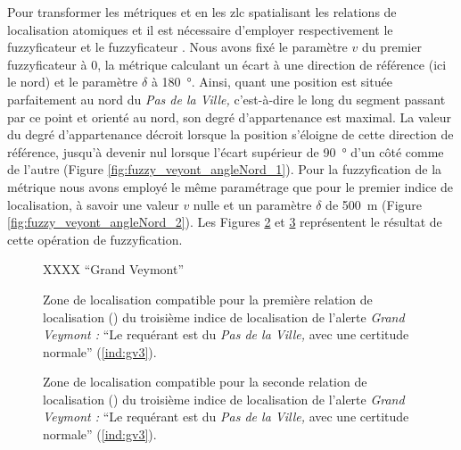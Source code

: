 Pour transformer les métriques  et
 en les \ac{zlc} spatialisant les relations de
localisation atomiques  et
 il est nécessaire
d'employer respectivement le fuzzyficateur  et
le fuzzyficateur . Nous avons fixé le
paramètre \(v\) du premier fuzzyficateur à 0, la métrique
 calculant un écart à une direction de
référence (ici le nord) et le paramètre \(\delta\) à
\SI{180}{\degree}. Ainsi, quant une position est située parfaitement
au nord du \emph{Pas de la Ville,} c'est-à-dire le long du segment
passant par ce point et orienté au nord, son degré d'appartenance est
maximal. La valeur du degré d'appartenance décroit lorsque la position
s'éloigne de cette direction de référence, jusqu'à devenir nul lorsque
l'écart supérieur de \SI{90}{\degree} d'un côté comme de l'autre
(Figure \ref{fig:fuzzy_veyont_angleNord_1}). Pour la fuzzyfication de
la métrique  nous avons employé le même
paramétrage que pour le premier indice de localisation, à savoir une
valeur \(v\) nulle et un paramètre \(\delta\) de \SI{500}{\meter}
(Figure \ref{fig:fuzzy_veyont_angleNord_2}). Les Figures
\ref{fig:ZLC_Nord_Pas_Ville} et \ref{fig:ZLC_Ext_Pas_Ville}
représentent le résultat de cette opération de fuzzyfication.

\begin{figure} \centering
\subfloat[\label{fig:fuzzy_veyont_angleNord_1}]{%
}\hspace{1cm}
  \subfloat[\label{fig:fuzzy_veyont_angleNord_2}]{%
}
  \caption{XXXX \enquote{Grand Veymont}}
  \label{fig:fuzzy_veyont_angleNord}
\end{figure}


\begin{figure}
  \centering
  
  \caption{Zone de localisation compatible pour la première relation
    de localisation (\protect{}) du troisième
    indice de localisation de l'alerte \emph{Grand Veymont :}
    \enquote{Le requérant est
      \protect{} du \emph{Pas de la
        Ville,} avec une certitude normale} (\ref{ind:gv3}).}
  \label{fig:ZLC_Nord_Pas_Ville}
\end{figure}


\begin{figure}
  \centering
  
  \caption{Zone de localisation compatible pour la seconde relation de
    localisation (\protect{})
    du troisième indice de localisation de l'alerte \emph{Grand
      Veymont :} \enquote{Le requérant est
      \protect{} du \emph{Pas de la
        Ville,} avec une certitude normale} (\ref{ind:gv3}).}
  \label{fig:ZLC_Ext_Pas_Ville}
\end{figure}

